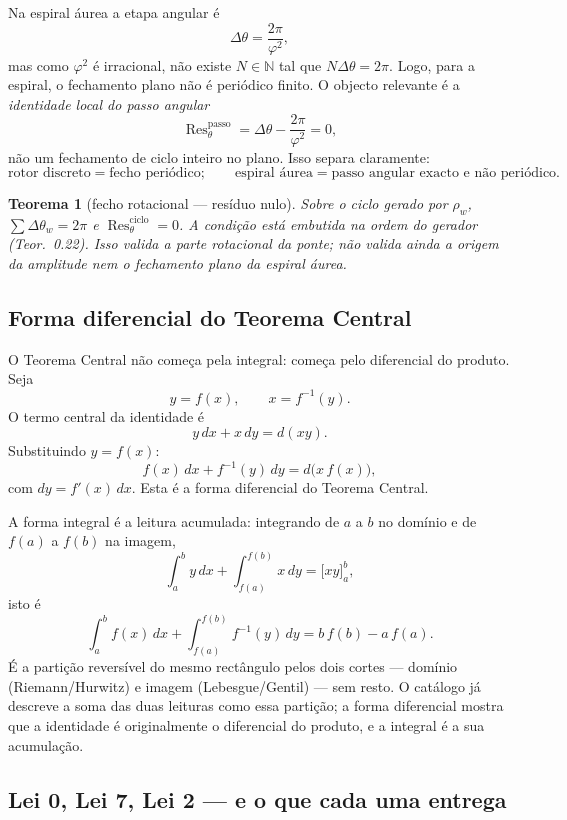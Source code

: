 \documentclass[11pt,a4paper]{article}
\newtheorem{teorema}{Teorema}
\begin{document}
Na espiral áurea a etapa angular é
\[
\Delta\theta=\frac{2\pi}{\varphi^2},
\]
mas como $\varphi^2$ é irracional, não existe $N\in\mathbb N$ tal que $N\Delta\theta=2\pi$.
Logo, para a espiral, o fechamento plano não é periódico finito. O objecto relevante é a
\emph{identidade local do passo angular}
\[
\operatorname{Res}^{\mathrm{passo}}_\theta
=\Delta\theta-\frac{2\pi}{\varphi^2}=0,
\]
não um fechamento de ciclo inteiro no plano. Isso separa claramente:
\[
\text{rotor discreto} = \text{fecho periódico};\qquad
\text{espiral áurea} = \text{passo angular exacto e não periódico.}
\]

\begin{teorema}[fecho rotacional --- resíduo nulo]
\label{thm:fecho-fase}
Sobre o ciclo gerado por $\rho_w$, $\sum\Delta\theta_w=2\pi$ e
$\operatorname{Res}^{\mathrm{ciclo}}_\theta=0$.
A condição está embutida na ordem do gerador (Teor.~0.22). Isso valida a parte
rotacional da ponte; não valida ainda a origem da amplitude nem o fechamento plano da espiral áurea.
\end{teorema}

\subsection{Forma diferencial do Teorema Central}

O Teorema Central não começa pela integral: começa pelo diferencial do produto.
Seja
\[
y=f(x),\qquad x=f^{-1}(y).
\]
O termo central da identidade é
\[
\boxed{y\,dx+x\,dy=d(xy)}.
\]
Substituindo $y=f(x)$:
\[
\boxed{f(x)\,dx+f^{-1}(y)\,dy=d\bigl(x\,f(x)\bigr)},
\]
com $dy=f'(x)\,dx$. Esta é a forma diferencial do Teorema Central.

A forma integral é a leitura acumulada: integrando de $a$ a $b$ no domínio e de $f(a)$ a $f(b)$ na imagem,
\[
\int_a^b y\,dx+\int_{f(a)}^{f(b)}x\,dy=\bigl[xy\bigr]_a^b,
\]
isto é
\[
\boxed{\int_a^b f(x)\,dx+\int_{f(a)}^{f(b)}f^{-1}(y)\,dy=b\,f(b)-a\,f(a).}
\]
É a partição reversível do mesmo rectângulo pelos dois cortes --- domínio (Riemann/Hurwitz)
e imagem (Lebesgue/Gentil) --- sem resto. O catálogo já descreve a soma das duas leituras
como essa partição; a forma diferencial mostra que a identidade é originalmente
o diferencial do produto, e a integral é a sua acumulação.

\subsection{Lei 0, Lei 7, Lei 2 --- e o que cada uma entrega}
\end{document}
